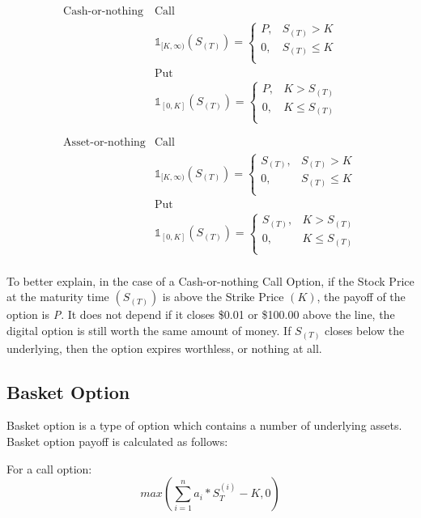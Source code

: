\documentclass[]{elsarticle}
\theoremstyle{definition}
\theoremstyle{remark}
\begin{document}
$$ \begin{array}{rcc}
\text{Cash-or-nothing} & \text{Call}\\
 & \mathbb{1}_{[K,\infty)}(S_{(T)})=
\begin{cases}
P, & S_{(T)} > K \\
0, & S_{(T)} \leq K\\
\end{cases}\\
 & \text{Put}\\
 & \mathbb{1}_{[0,K]}(S_{(T)})=
\begin{cases}
P, & K > S_{(T)} \\
0, & K \leq S_{(T)}\\
\end{cases} \\
\\
\\
\text{Asset-or-nothing} & \text{Call}\\
& \mathbb{1}_{[K,\infty)}(S_{(T)})=
\begin{cases}
S_{(T)}, & S_{(T)} > K \\
0, & S_{(T)} \leq K\\
\end{cases}\\
& \text{Put}\\
& \mathbb{1}_{[0,K]}(S_{(T)})=
\begin{cases}
S_{(T)}, & K > S_{(T)} \\
0, & K \leq S_{(T)}\\
\end{cases} \\
\end{array} $$

To better explain, in the case of a Cash-or-nothing Call Option, if the Stock Price at the maturity time $(S_{(T)})$ is above the Strike Price $(K)$, the payoff of the option is \textit{P}.  It does not depend if it closes \$0.01 or \$100.00 above the line, the  digital option is still worth the same amount of money. If $S_{(T)}$  closes below the underlying, then the option expires worthless, or 
nothing at all.


\subsection{Basket Option}
Basket option is a type of option  which contains a number of underlying assets. Basket option payoff is calculated as follows:

For a call option:
\[max(\sum_{i=1}^n {a_i*S_T^{(i)}} - K, 0)\]
\end{document}
